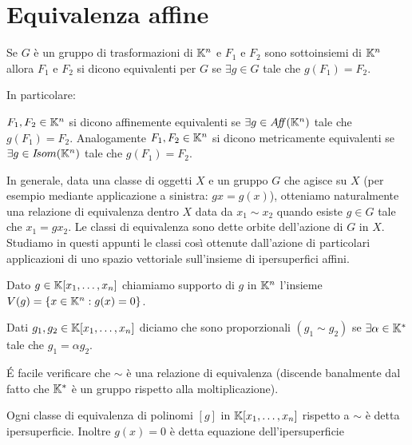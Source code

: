 \section{Equivalenza affine}

\begin{definition}
	Se $G$ è un gruppo di trasformazioni di $\mathbb K^n$ e $F_1$ e $F_2$ sono sottoinsiemi di $\mathbb K^n$ allora $F_1$ e $F_2$ si dicono equivalenti per 
	$G$ se $\exists g\in G$ tale che $g(F_1)=F_2$.
\end{definition}

In particolare:

\begin{definition}
	$F_1,F_2\in\mathbb K^n$ si dicono affinemente equivalenti se $\exists g \in A\!f\!\!f(\mathbb K^n)$ tale che $g(F_1) = F_2 .$
	Analogamente $F_1 , F_2 \in \mathbb K^n$ si dicono metricamente equivalenti se $\exists g \in I\!som(\mathbb K^n)$ tale che $g(F_1) = F_2 .$
\end{definition}
\begin{remark}
	In generale, data una classe di oggetti $X$ e un gruppo $G$ che agisce su $X$ (per esempio mediante applicazione a sinistra: $gx=g(x)$),
	otteniamo naturalmente una relazione di equivalenza dentro $X$ data da $x_1\sim x_2$ quando esiste $g\in G$ tale che $ x_1 = gx_2$.
	Le classi di equivalenza sono dette orbite dell'azione di $G$ in $X$. Studiamo in questi appunti le classi così ottenute dall'azione
	di particolari applicazioni di uno spazio vettoriale sull'insieme di ipersuperfici affini.
\end{remark}




\begin{definition}
	Dato $g\in \mathbb K[x_1,\dots,x_n]$ chiamiamo supporto di $g$ in $\mathbb K^n$ l'insieme $V(g)=\{x\in \mathbb K^n : g(x)=0\}$.
\end{definition}

\begin{definition}
	Dati $g_1,g_2\in \mathbb K[x_1,\dots,x_n]$ diciamo che sono proporzionali $(g_1\sim g_2)$ se $\exists \alpha \in \mathbb K^{*}$ tale che $g_1=\alpha g_2$.
\end{definition}
\begin{remark}
	\'E facile verificare che $\sim$ è una relazione di equivalenza
	(discende banalmente dal fatto che $\mathbb K^{*}$ è un gruppo rispetto alla moltiplicazione).
\end{remark}

\begin{definition}
	Ogni classe di equivalenza di polinomi $[g]$ in $\mathbb K[x_1,\dots,x_n]$ rispetto a $\sim$ è detta ipersuperficie.
	Inoltre $g(x)=0$ è detta equazione dell'ipersuperficie
\end{definition}

